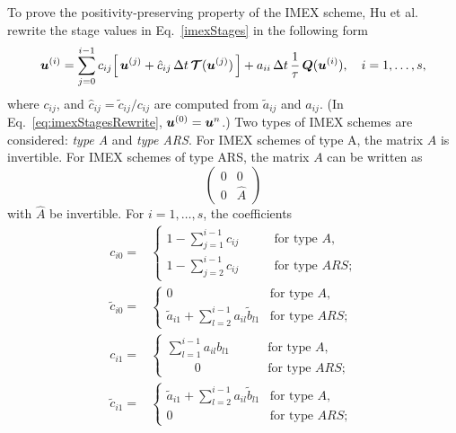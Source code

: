 To prove the positivity-preserving property of the IMEX scheme, Hu et al. \cite{hu_etal_2017} rewrite the stage values in Eq.~\eqref{imexStages} in the following form
\begin{equation}
  \boldsymbol{u}^{(i)}
  =\sum_{j=0}^{i-1}c_{ij}\Big[\,\boldsymbol{u}^{(j)}+\hat{c}_{ij}\,\Delta t\,\boldsymbol{\mathcal{T}}(\boldsymbol{u}^{(j)})\,\Big]
  +a_{ii}\,\Delta t\,\frac{1}{\tau}\,\boldsymbol{Q}(\boldsymbol{u}^{(i)}),\quad i=1,\ldots,s,
  \label{eq:imexStagesRewrite}
\end{equation}
where $c_{ij}$, and $\hat{c}_{ij}=\tilde{c}_{ij}/c_{ij}$ are computed from $\tilde{a}_{ij}$ and $a_{ij}$.
(In Eq.~\eqref{eq:imexStagesRewrite}, $\boldsymbol{u}^{(0)}=\boldsymbol{u}^{n}$.)  
Two types of IMEX schemes are considered: \emph{type A} and \emph{type ARS}.  
For IMEX schemes of type A, the matrix $A$ is invertible.  
For IMEX schemes of type ARS, the matrix $A$ can be written as
\[\left( 
   \begin{matrix} 
       0 & 0 \\ 
       0 & \hat{A}
   \end{matrix}
\right)\]
with $\hat{A}$ be invertible.
For $i=1,\ldots,s$, the coefficients
\begin{align*}
  c_{i0}
  =&\left\{
  \begin{array}{cl}
    1 - \sum_{j=1}^{i-1}c_{ij}  & \qquad \text{for type $A$,} \\
    1 - \sum_{j=2}^{i-1}c_{ij}  & \qquad \text{for type $ARS$;}
  \end{array}
  \right.\\
  \tilde{c}_{i0}
  =&\left\{
  \begin{array}{cl}
    0  & \text{for type $A$,} \\
   \tilde{a}_{i1} + \sum_{l=2}^{i-1}a_{il}\tilde{b}_{l1}  & \text{for type $ARS$;}
  \end{array}
  \right.\\
  c_{i1}
    =&\left\{
    \begin{array}{cl}
      \sum_{l =1}^{i-1} a_{il}b_{l1} & \qquad ~\text{for type $A$,} \\
      \qquad ~ 0  & \qquad ~\text{for type $ARS$;}
    \end{array}
    \right.\\
    \tilde{c}_{i1}
    =&\left\{
      \begin{array}{cl}
       \tilde{a}_{i1} + \sum_{l=2}^{i-1}a_{il}\tilde{b}_{l1} & \text{for type $A$,} \\
       0  & \text{for type $ARS$;}
      \end{array}
      \right.
\end{align*}
